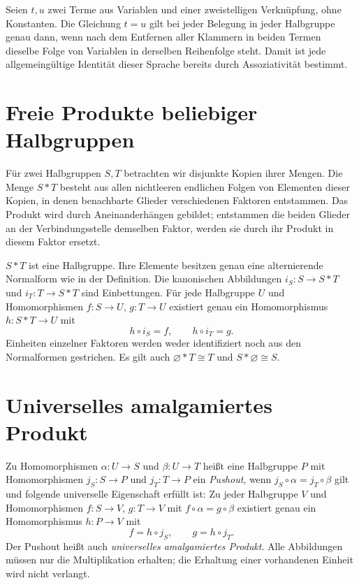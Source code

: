 \begin{theorem}
\label{b28guide:thm:identities}
Seien $t,u$ zwei Terme aus Variablen und einer zweistelligen
Verknüpfung, ohne Konstanten.
Die Gleichung $t=u$ gilt bei jeder Belegung in jeder Halbgruppe
genau dann, wenn nach dem Entfernen aller Klammern in beiden
Termen dieselbe Folge von Variablen in derselben Reihenfolge steht.
Damit ist jede allgemeingültige Identität dieser Sprache bereits
durch Assoziativität bestimmt.
\cite{harju,burris}
\end{theorem}

\section{Freie Produkte beliebiger Halbgruppen}

\begin{definition}
Für zwei Halbgruppen $S,T$ betrachten wir disjunkte Kopien ihrer Mengen.
Die Menge $S*T$ besteht aus allen nichtleeren endlichen Folgen von
Elementen dieser Kopien, in denen benachbarte Glieder verschiedenen
Faktoren entstammen. Das Produkt wird durch Aneinanderhängen gebildet;
entstammen die beiden Glieder an der Verbindungsstelle demselben Faktor,
werden sie durch ihr Produkt in diesem Faktor ersetzt.
\end{definition}

\begin{theorem}
\label{b28guide:thm:free-product}
$S*T$ ist eine Halbgruppe. Ihre Elemente besitzen genau eine
alternierende Normalform wie in der Definition.
Die kanonischen Abbildungen $i_S:S\to S*T$ und $i_T:T\to S*T$
sind Einbettungen. Für jede Halbgruppe $U$ und Homomorphismen
$f:S\to U$, $g:T\to U$ existiert genau ein Homomorphismus
$h:S*T\to U$ mit
\[
 h\circ i_S=f,\qquad h\circ i_T=g.
\]
Einheiten einzelner Faktoren werden weder identifiziert noch
aus den Normalformen gestrichen. Es gilt auch
$\varnothing*T\cong T$ und $S*\varnothing\cong S$.
\cite{nybergbrodda2023,howie}
\end{theorem}
\section{Universelles amalgamiertes Produkt}

\begin{definition}
Zu Homomorphismen $\alpha:U\to S$ und $\beta:U\to T$ heißt
eine Halbgruppe $P$ mit Homomorphismen $j_S:S\to P$ und $j_T:T\to P$
ein \emph{Pushout}, wenn $j_S\circ\alpha=j_T\circ\beta$ gilt
und folgende universelle Eigenschaft erfüllt ist:
Zu jeder Halbgruppe $V$ und Homomorphismen $f:S\to V$, $g:T\to V$
mit $f\circ\alpha=g\circ\beta$ existiert genau ein Homomorphismus
$h:P\to V$ mit
\[
 f=h\circ j_S,\qquad g=h\circ j_T.
\]
Der Pushout heißt auch \emph{universelles amalgamiertes Produkt}.
Alle Abbildungen müssen nur die Multiplikation erhalten;
die Erhaltung einer vorhandenen Einheit wird nicht verlangt.
\end{definition}

